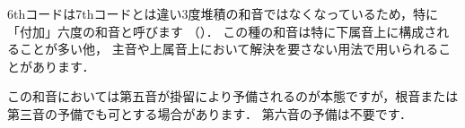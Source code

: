 \documentclass[dvipdfmx,uplatex,b5paper,openany,jbase=12Q,nomag*,textwidth-limit=44%
               ]{gachimuchi}
\begin{document}
\begin{floatMusic}[pos=ht]
  \en%
  \alaligne%
  \makeatletter\hardspace{-\sign@skip}\makeatother
  \makeatletter\hardspace{.8\Internote}\makeatother
  \znotes{}\en%
  \Notes%
  \sk%
  \en%
  \Notes%
  \en%
  \Notes%
  \sk%
  \en%
  \Notes%
  \en%
  \Notes%
  \sk%
  \en%
  \Notes%
  \en%
  \Notes%
  \sk%
  \en%
  \alaligne%
  \makeatletter\hardspace{-\sign@skip}\makeatother
  \makeatletter\hardspace{.8\Internote}\makeatother
  \znotes{}\en%
  \Notes%
  \en%
  \Notes%
  \en%
  \Notes%
  \sk%
  \en%
  \Notes%
  \en%
  \Notes%
  \sk%
  \en%
  \Notes%
  \sk%
  \en%
  \Notes%
  \sk%
  \en%
  \endpiece%
\end{floatMusic}

6thコードは7thコードとは違い3度堆積の和音ではなくなっているため，特に「付加」六度の和音と呼びます
（）．
この種の和音は特に下属音上に構成されることが多い他，
主音や上属音上において解決を要さない用法で用いられることがあります．

この和音においては第五音が掛留により予備されるのが本態ですが，根音または第三音の予備でも可とする場合があります．
第六音の予備は不要です．
\end{document}
